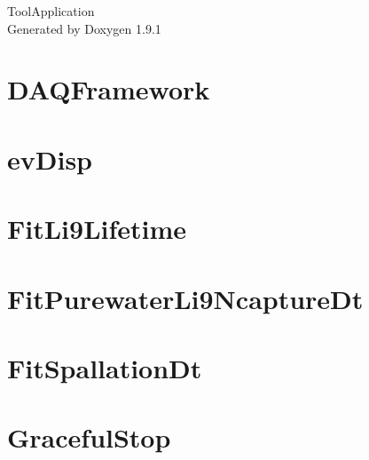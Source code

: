 \let\mypdfximage\pdfximage\def\pdfximage{\immediate\mypdfximage}\documentclass[twoside]{book}
\newcommand{\+}{\discretionary{\mbox{\scriptsize$\hookleftarrow$}}{}{}}
\newcommand{\clearemptydoublepage}{%
  \newpage{\pagestyle{empty}\cleardoublepage}%
}
\begin{document}
\raggedbottom

\hypersetup{pageanchor=false,
             bookmarksnumbered=true,
             pdfencoding=unicode
            }
\begin{titlepage}
\vspace*{7cm}
\begin{center}%
{\Large Tool\+Application }\\
\vspace*{1cm}
{\large Generated by Doxygen 1.9.1}\\
\end{center}
\end{titlepage}
\clearemptydoublepage
{}
\tableofcontents
\clearemptydoublepage
{}
\hypersetup{pageanchor=true}

\chapter{DAQFramework}
\label{md_UserTools_CompareRootFiles_README}

\chapter{ev\+Disp}
\label{md_UserTools_evDisp_README}

\chapter{Fit\+Li9\+Lifetime}
\label{md_UserTools_FitLi9Lifetime_README}

\chapter{Fit\+Purewater\+Li9\+Ncapture\+Dt}
\label{md_UserTools_FitPurewaterLi9NcaptureDt_README}

\chapter{Fit\+Spallation\+Dt}
\label{md_UserTools_FitSpallationDt_README}

\chapter{Graceful\+Stop}
\label{md_UserTools_GracefulStop_README}

\end{document}
